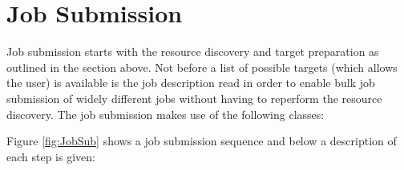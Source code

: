 \documentclass{book}
\begin{document}
\section{Job Submission}
\label{sec:JobSubmission}
Job submission starts with the resource discovery and target preparation as outlined in the section above. Not before a list 
of possible targets (which allows the user) is available is the job description read in order to enable bulk job submission of 
widely different jobs without having to reperform the resource discovery. The job submission makes use of the following classes:

\begin{figure}[ht]
\end{figure}

Figure \ref{fig:JobSub} shows a job submission sequence and below a description of each step is given:
\end{document}
